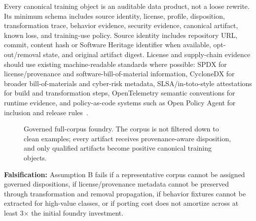 Every canonical training object is an auditable data product, not a loose rewrite. Its minimum schema includes source identity, license, profile, disposition, transformation trace, behavior evidence, security evidence, canonical artifact, known loss, and training-use policy.
Source identity includes repository URL, commit, content hash or Software Heritage identifier when available, opt-out/removal state, and original artifact digest. License and supply-chain evidence should use existing machine-readable standards where possible: SPDX for license/provenance and software-bill-of-material information, CycloneDX for broader bill-of-materials and cyber-risk metadata, SLSA/in-toto-style attestations for build and transformation steps, OpenTelemetry semantic conventions for runtime evidence, and policy-as-code systems such as Open Policy Agent for inclusion and release rules~\cite{spdxOverview,cyclonedx,openTelemetrySemconv,openPolicyAgent,slsa,intoto}.

\begin{figure}[t]
\centering
\scriptsize
{}
\caption{Governed full-corpus foundry. The corpus is not filtered down to clean examples; every artifact receives provenance-aware disposition, and only qualified artifacts become positive canonical training objects.}
\label{fig:porting}
\end{figure}

\textbf{Falsification:} Assumption B fails if a representative corpus cannot be assigned governed dispositions, if license/provenance metadata cannot be preserved through transformation and removal propagation, if behavior fixtures cannot be extracted for high-value classes, or if porting cost does not amortize across at least 3$\times$ the initial foundry investment.

